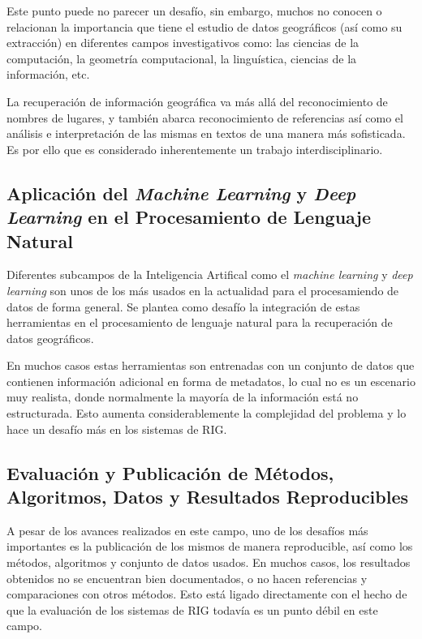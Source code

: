 \documentclass{llncs}
\begin{document}
Este punto puede no parecer un desafío, sin embargo, muchos no conocen o relacionan
la importancia que tiene el estudio de datos geográficos (así como su extracción)
en diferentes campos investigativos como: las ciencias de la computación, la 
geometría computacional, la linguística, ciencias de la información, etc.

La recuperación de información geográfica va más allá del reconocimiento de
nombres de lugares, y también abarca reconocimiento de referencias así como el
análisis e interpretación de las mismas en textos de una manera más
sofisticada. Es por ello que es considerado inherentemente un trabajo
interdisciplinario.

\subsection{Aplicación del \emph{Machine Learning} y \emph{Deep Learning} en el
Procesamiento de Lenguaje Natural}\label{sec:ml}

Diferentes subcampos de la Inteligencia Artifical como el \emph{machine
learning} y \emph{deep learning} son unos de los más usados en la actualidad
para el procesamiendo de datos de forma general. Se plantea como desafío la
integración de estas herramientas en el procesamiento de lenguaje natural para
la recuperación de datos geográficos.

En muchos casos estas herramientas son entrenadas con un conjunto de datos que
contienen información adicional en forma de metadatos, lo cual no es un escenario
muy realista, donde normalmente la mayoría de la información está no estructurada.
Esto aumenta considerablemente la complejidad del problema y lo hace un desafío más
en los sistemas de RIG.

\subsection{Evaluación y Publicación de Métodos, Algoritmos, Datos y
Resultados Reproducibles}\label{sec:publ}

A pesar de los avances realizados en este campo, uno de los desafíos más
importantes es la publicación de los mismos de manera reproducible, así como
los métodos, algoritmos y conjunto de datos usados. En muchos casos, los
resultados obtenidos no se encuentran bien documentados, o no hacen referencias
y comparaciones con otros métodos. Esto está ligado directamente con el hecho
de que la evaluación de los sistemas de RIG todavía es un punto débil en este
campo.
\end{document}
